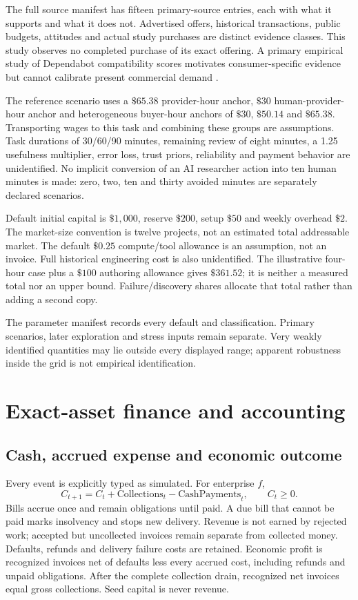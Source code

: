 \documentclass[11pt,a4paper]{article}
\newcommand{\money}[1]{\(\$#1\)}
\begin{document}
The full source manifest has fifteen primary-source entries, each with what it supports and what
it does not. Advertised offers, historical transactions, public budgets, attitudes and actual
study purchases are distinct evidence classes. This study observes no completed purchase of its
exact offering. A primary empirical study of Dependabot compatibility scores motivates
consumer-specific evidence but cannot calibrate present commercial demand \cite{dependabotstudy}.

The reference scenario uses a \money{65.38} provider-hour anchor, \money{30} human-provider-hour
anchor and heterogeneous buyer-hour anchors of \money{30}, \money{50.14} and \money{65.38}.
Transporting wages to this task and combining these groups are assumptions. Task durations of
30/60/90 minutes, remaining review of eight minutes, a 1.25 usefulness multiplier, error loss,
trust priors, reliability and payment behavior are unidentified. No implicit conversion of an
AI researcher action into ten human minutes is made: zero, two, ten and thirty avoided minutes
are separately declared scenarios.

Default initial capital is \money{1,000}, reserve \money{200}, setup \money{50} and weekly overhead
\money{2}. The market-size convention is twelve projects, not an estimated total addressable
market. The default \money{0.25} compute/tool allowance is an assumption, not an invoice.
Full historical engineering cost is also unidentified. The illustrative four-hour case plus a
\money{100} authoring allowance gives \money{361.52}; it is neither a measured total nor an upper
bound. Failure/discovery shares allocate that total rather than adding a second copy.

The parameter manifest records every default and classification. Primary scenarios, later
exploration and stress inputs remain separate. Very weakly identified quantities may lie outside
every displayed range; apparent robustness inside the grid is not empirical identification.

\section{Exact-asset finance and accounting}
\subsection{Cash, accrued expense and economic outcome}
Every event is explicitly typed as simulated. For enterprise \(f\),
\begin{equation}
C_{t+1}=C_t+\mathrm{Collections}_t-\mathrm{CashPayments}_t,\qquad C_t\geq0.
\end{equation}
Bills accrue once and remain obligations until paid. A due bill that cannot be paid marks
insolvency and stops new delivery. Revenue is not earned by rejected work; accepted but
uncollected invoices remain separate from collected money. Defaults, refunds and delivery
failure costs are retained. Economic profit is recognized invoices net of defaults less every accrued cost,
including refunds and unpaid obligations. After the complete collection drain, recognized net
invoices equal gross collections. Seed capital is never revenue.
\end{document}
